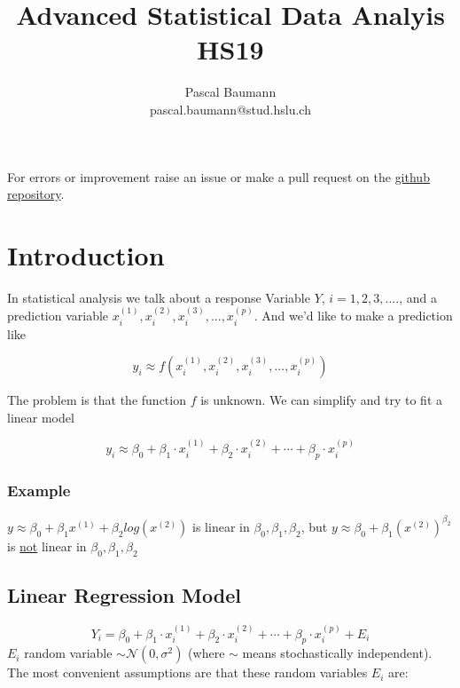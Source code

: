\documentclass[11pt]{article}
\begin{document}
\title{Advanced Statistical Data Analyis HS19}
\author{Pascal Baumann\\pascal.baumann@stud.hslu.ch}
\maketitle

For errors or improvement raise an issue or make a pull request on the \href{https://github.com/KilnOfTheSecondFlame/mse_summaries}{github repository}.

\tableofcontents

\newpage

\section{Introduction}

In statistical analysis we talk about a response Variable $Y$, $i=1,2,3,....$, and a prediction variable $x_i^{(1)}, x_i^{(2)}, x_i^{(3)}, ..., x_i^{(p)}$. And we'd like to make a prediction like

\begin{equation*}
    y_i \approx f(x_i^{(1)}, x_i^{(2)}, x_i^{(3)}, ..., x_i^{(p)})
\end{equation*}

The problem is that the function $f$ is unknown. We can simplify and try to fit a linear model

\begin{equation*}
    y_i \approx \beta_0 + \beta_1\cdot x_i^{(1)} + \beta_2\cdot x_i^{(2)} + \cdots + \beta_p\cdot x_i^{(p)}
\end{equation*}

\subsubsection{Example}

$y \approx \beta_0 + \beta_1 x^{(1)} + \beta_2 log(x^{(2)})$ is linear in $\beta_0, \beta_1, \beta_2$, but $y \approx \beta_0 + \beta_1 (x^{(2)})^{\beta_2}$ is \underline{not} linear in $\beta_0, \beta_1, \beta_2$


\subsection{Linear Regression Model}
\begin{equation*}
    Y_i = \beta_0 + \beta_1\cdot x_i^{(1)} + \beta_2\cdot x_i^{(2)} + \cdots + \beta_p\cdot x_i^{(p)} + E_i
\end{equation*}
$E_i$ \: random variable $\sim \mathcal{N}(0, \sigma ^2)$ (where $\sim$ means stochastically independent). The most convenient assumptions are that these random variables $E_i$ are:
\end{document}
